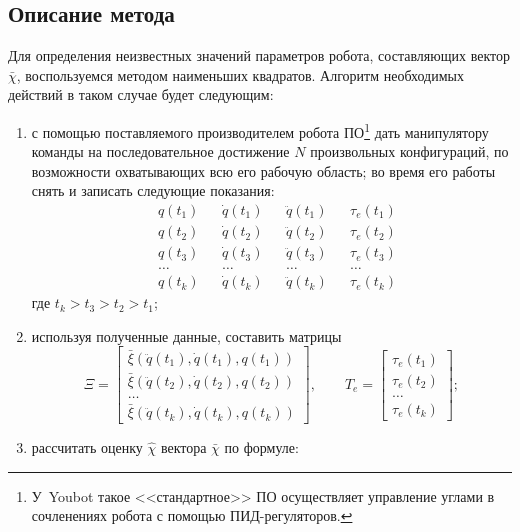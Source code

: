 \subsection{Описание метода}
Для определения неизвестных значений параметров робота, составляющих вектор $\bar\chi$, воспользуемся методом наименьших квадратов.
Алгоритм необходимых действий в таком случае будет следующим:
\begin{enumerate}
    \item с помощью поставляемого производителем робота ПО\footnote{У~Youbot такое <<стандартное>> ПО осуществляет управление углами в сочленениях робота с помощью ПИД-регуляторов.} дать манипулятору команды на последовательное достижение $N$ произвольных конфигураций, по возможности охватывающих всю его рабочую область; во время его работы снять и записать следующие показания:
        \begin{align*}
            &q(t_1) &&\dot{q}(t_1) &&\ddot{q}(t_1) && \tau_e(t_1) \\
            &q(t_2) &&\dot{q}(t_2) &&\ddot{q}(t_2) && \tau_e(t_2) \\
            &q(t_3) &&\dot{q}(t_3) &&\ddot{q}(t_3) && \tau_e(t_3) \\
            &\ldots &&\ldots &&\ldots && \ldots \\
            &q(t_{k}) &&\dot{q}(t_k) &&\ddot{q}(t_k) && \tau_e(t_k)
        \end{align*}
        где $t_k>t_3>t_2>t_1$;
    \item используя полученные данные, составить матрицы
        \begin{equation}
            \Xi =
            \begin{bmatrix}
                \bar\xi(\ddot{q}(t_1), \dot{q}(t_1), q(t_1)) \\
                \bar\xi(\ddot{q}(t_2), \dot{q}(t_2), q(t_2)) \\
                \ldots \\
                \bar\xi(\ddot{q}(t_k), \dot{q}(t_k), q(t_k))
            \end{bmatrix}\!\!,
            \qquad
            T_e =
            \begin{bmatrix}
                \tau_e(t_1) \\ \tau_e(t_2) \\ \ldots \\ \tau_e(t_k)
            \end{bmatrix}\!\!;
        \end{equation}
    \item \label{item_estimate}рассчитать оценку $\hat{\chi}$ вектора $\bar\chi$ по формуле:

\end{enumerate}

